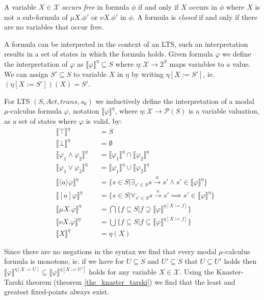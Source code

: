 A variable $X \in \mathcal{X}$ \textit{occurs free} in formula $\phi$ if and only if $X$ occurs in $\phi$ where $X$ is not a sub-formula of $\mu X.\phi'$ or $\nu X.\phi'$ in $\phi$. A formula is \textit{closed} if and only if there are no variables that occur free.

A formula can be interpreted in the context of an LTS, such an interpretation results in a set of states in which the formula holds. Given formula $\varphi$ we define the interpretation of $\varphi$ as $\llbracket \varphi \rrbracket ^\eta  \subseteq S$ where $\eta : \mathcal{X}\rightarrow 2^S$ maps variables to a value. We can assign $S' \subseteq S$ to variable $X$ in $\eta$ by writing $\eta[X:=S']$, ie. $(\eta[X:=S'])(X) = S'$.
\begin{definition}
	\label{def_mu_sem} For LTS $(S, Act, trans, s_0)$ we inductively define the interpretation of a modal $\mu$-calculus formula $\varphi$, notation
	$\llbracket \varphi \rrbracket^\eta$, where $\eta : \mathcal{X} \rightarrow \mathcal{P}(S)$ is a variable valuation, as a set of states
	where $\varphi$ is valid, by:
	\begin{align*}
	&\llbracket {\top} \rrbracket^\eta &&= S\\
	&\llbracket {\bot} \rrbracket^\eta &&= \emptyset\\
	&\llbracket \varphi_1 \wedge \varphi_2 \rrbracket^\eta &&= \llbracket \varphi_1 \rrbracket^\eta \cap \llbracket \varphi_2 \rrbracket^\eta \\
	&\llbracket \varphi_1 \vee \varphi_2 \rrbracket^\eta &&= \llbracket \varphi_1 \rrbracket^\eta \cup \llbracket \varphi_2 \rrbracket^\eta\\
	&\llbracket \langle a \rangle \varphi \rrbracket^\eta &&= \{s \in S|\exists_{s' \in S} s \xrightarrow {a} s' \wedge s' \in \llbracket \varphi \rrbracket^\eta\}\\
	&\llbracket [ a ] \varphi \rrbracket^\eta &&= \{s \in S|\forall_{s' \in S} s \xrightarrow {a} s' \implies s' \in \llbracket \varphi \rrbracket^\eta\}\\
	&\llbracket \mu X. \varphi \rrbracket^\eta &&= \bigcap\{f \subseteq S | f \supseteq \llbracket \varphi \rrbracket^{\eta[X:=f]}\}\\
	&\llbracket \nu X. \varphi \rrbracket^\eta &&= \bigcup\{f \subseteq S | f \subseteq \llbracket \varphi \rrbracket^{\eta[X:=f]}\}\\
	&\llbracket X \rrbracket^\eta &&= \eta(X)
	\end{align*}
\end{definition}
Since there are no negations in the syntax we find that every modal $\mu$-calculus formula is monotone, ie. if we have for $U \subseteq S$ and $U' \subseteq S$ that $U \subseteq U'$ holds then $\llbracket \varphi \rrbracket^{\eta[X:=U]} \subseteq \llbracket \varphi \rrbracket^{\eta[X:=U']}$ holds for any variable $X \in \mathcal{X}$. Using the Knaster-Tarski theorem (theorem \ref{the_knaster_tarski}) we find that the least and greatest fixed-points always exist.

